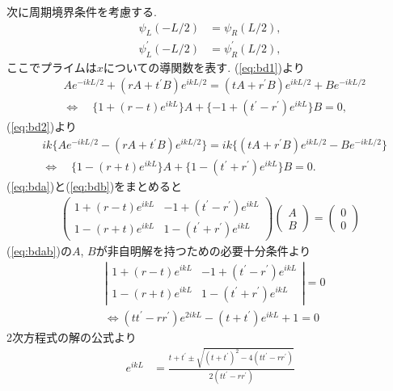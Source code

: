 \documentclass[10pt,a4j]{jarticle}
\begin{document}
次に周期境界条件を考慮する. 
\begin{align}
\psi_L(-L/2) &= \psi_R(L/2), \label{eq:bd1} \\
\psi_L^\prime(-L/2) &= \psi_R^\prime (L/2), \label{eq:bd2}
\end{align}
ここでプライムは$x$についての導関数を表す. (\ref{eq:bd1})より
\begin{align}
& A e^{-ikL/2} + (rA + t^{\prime}B) e^{ikL/2} = (tA + r^{\prime}B)e^{ikL/2} + Be^{-ikL/2} \nonumber \\
& \Longleftrightarrow \quad \{ 1+(r-t)e^{ikL} \} A + \{ -1 + (t^{\prime} - r^{\prime}) e^{ikL} \} B = 0, 
\label{eq:bda} 
\end{align}
(\ref{eq:bd2})より
\begin{align}
& ik \bigl\{A e^{-ikL/2} -(rA + t^{\prime}B) e^{ikL/2} \bigr\} 
= ik \bigl\{ (tA+r^{\prime}B)e^{ikL/2} - B e^{-ikL/2} \bigr\} \nonumber \\
& \Longleftrightarrow \quad \{ 1- (r+t) e^{ikL} \} A + \{ 1 - (t^{\prime} + r^{\prime})e^{ikL} \}B = 0.
\label{eq:bdb}
\end{align}
(\ref{eq:bda})と(\ref{eq:bdb})をまとめると
\begin{eqnarray}
\left( \begin{array}{cc}
1+ (r-t) e^{ikL} & -1 + (t^{\prime} - r^{\prime}) e^{ikL} \\
1-(r+t) e^{ikL} & 1-(t^{\prime} + r^{\prime}) e^{ikL} 
\end{array} \right)
\left( \begin{array}{c} A \\ B \end{array} \right)
= \left( \begin{array}{c} 0 \\ 0 \end{array} \right)
\label{eq:bdab}
\end{eqnarray}
(\ref{eq:bdab})の$A$, $B$が非自明解を持つための必要十分条件より
\begin{align}
& \left| \begin{array}{cc}
1+ (r-t) e^{ikL} & -1 + (t^{\prime} - r^{\prime}) e^{ikL} \\
1-(r+t) e^{ikL} & 1-(t^{\prime} + r^{\prime}) e^{ikL} 
\end{array} \right| = 0 \nonumber \\
& \Longleftrightarrow  (tt^{\prime} - rr^{\prime})e^{2ikL} -(t+t^{\prime}) e^{ikL} + 1 = 0
\label{eq:det}
\end{align}
2次方程式の解の公式より
\begin{align}
 e^{ikL} &= \frac{t+t^{\prime} \pm \sqrt{(t+t^{\prime})^2 -4(tt^{\prime} - rr^{\prime})} }{2(tt^{\prime} - rr^{\prime})} 
\end{align}
\end{document}

